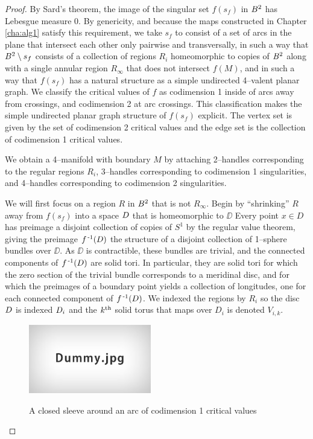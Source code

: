 \begin{proof}
	By Sard's theorem, the image of the singular set $f(s_f)$ in $B^2$ has Lebesgue measure 0.
	By genericity, and because the maps constructed in Chapter \ref{cha:alg1} satisfy this requirement, we take $s_f$ to consist of a set of arcs in the plane that intersect each other only pairwise and transversally, in such a way that $B^2\setminus s_f$ consists of a collection of regions $R_i$ homeomorphic to copies of $B^2$ along with a single annular region $R_\infty$ that does not intersect $f(M)$, and in such a way that $f(s_f)$ has a natural structure as a simple undirected 4--valent planar graph.
	We classify the critical values of $f$ as codimension 1 inside of arcs away from crossings, and codimension 2 at arc crossings.
	This classification makes the simple undirected planar graph structure of $f(s_f)$ explicit.
	The vertex set is given by the set of codimension 2 critical values and the edge set is the collection of codimension 1 critical values.
	
	We obtain a 4--manifold with boundary $M$ by attaching 2--handles corresponding to the regular regions $R_i$, 3--handles corresponding to codimension 1 singularities, and 4--handles corresponding to codimension 2 singularities.
	
	We will first focus on a region $R$ in $B^2$ that is not $R_\infty$.
	Begin by ``shrinking'' $R$ away from $f(s_f)$ into a space $D$ that is homeomorphic to $\DD$
	Every point $x\in D$ has preimage a disjoint collection of copies of $S^1$ by the regular value theorem, giving the preimage $f^{\,\text{-}1}(D)$ the structure of a disjoint collection of 1--sphere bundles over $\DD$.
	As $\DD$ is contractible, these bundles are trivial, and the connected components of $f^{\,\text{-}1}(D)$ are solid tori.
	In particular, they are solid tori for which the zero section of the trivial bundle corresponds to a meridinal disc, and for which the preimages of a boundary point yields a collection of longitudes, one for each connected component of $f^{\,\text{-}1}(D)$.
	We indexed the regions by $R_i$ so the disc $D$ is indexed $D_i$ and the $k^{\text{th}}$ solid torus that maps over $D_i$ is denoted $V_{i,k}$.
	
	\begin{figure}
		\centering
		\caption{A closed sleeve around an arc of codimension 1 critical values}
		\includegraphics[height=3cm]{figures/dummy.jpg}
		\label{fig:arcsleeve}
	\end{figure}
	

\end{proof}
